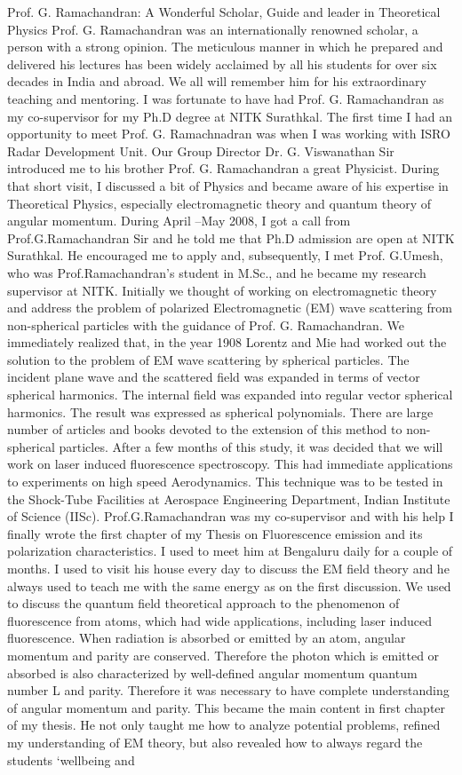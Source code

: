 Prof. G. Ramachandran: A Wonderful Scholar, Guide and leader in Theoretical Physics
	Prof. G. Ramachandran was an internationally renowned scholar, a person with a strong opinion. The meticulous manner in which he prepared and delivered his lectures has been widely acclaimed by all his students for over six decades in India and abroad. We all will remember him for his extraordinary teaching and mentoring.
I was fortunate to have had Prof. G. Ramachandran as my co-supervisor for my Ph.D degree at NITK Surathkal. The first time I had an opportunity to meet Prof. G. Ramachnadran was when I was working with ISRO Radar Development Unit. Our Group Director Dr. G. Viswanathan Sir introduced me to his brother Prof. G. Ramachandran a great Physicist. During that short visit, I discussed a bit of Physics and became aware of his expertise in Theoretical Physics, especially electromagnetic theory and quantum theory of angular momentum. During April –May 2008, I got a call from Prof.G.Ramachandran Sir and he told me that Ph.D admission are open at NITK Surathkal. He encouraged me to apply and, subsequently, I met Prof. G.Umesh, who was Prof.Ramachandran’s student in M.Sc., and he became my research supervisor at NITK. Initially we thought of working on electromagnetic theory and address the problem of polarized Electromagnetic (EM) wave scattering from non-spherical particles with the guidance of Prof. G. Ramachandran. We immediately realized that, in the year 1908 Lorentz and Mie had worked out the solution to the problem of EM wave scattering by spherical particles. The incident plane wave and the scattered field was expanded in terms of vector spherical harmonics. The internal field was expanded into regular vector spherical harmonics. The result was expressed as spherical polynomials. There are large number of articles and books devoted to the extension of this method to non-spherical particles. After a few months of this study, it was decided that we will work on  laser induced fluorescence spectroscopy. This had immediate applications to experiments on high speed Aerodynamics. This technique was to be tested in the Shock-Tube Facilities at Aerospace Engineering Department, Indian Institute of Science (IISc). Prof.G.Ramachandran was my co-supervisor and with his help I finally wrote the first chapter of my Thesis on Fluorescence emission and its polarization characteristics. I used to meet him at Bengaluru daily for a couple of months. I used to visit his house every day to discuss the EM field theory and he always used to teach me  with the same energy as on the first discussion. We used to discuss the quantum field theoretical approach to the phenomenon of fluorescence from atoms, which had wide applications, including laser induced fluorescence. When radiation is absorbed or emitted by an atom, angular momentum and parity are conserved. Therefore the photon which is emitted or absorbed is also characterized by well-defined angular momentum quantum number L and parity. Therefore it was necessary to have complete understanding of angular momentum and parity. This became the main content in first chapter of my thesis. He not only taught me how to analyze potential problems, refined my understanding of EM theory, but also revealed how to always regard the students ‘wellbeing and 